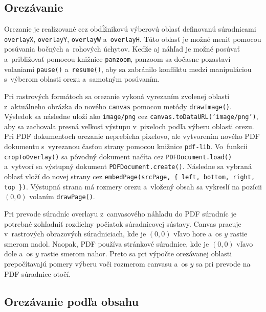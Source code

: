 \subsection{Orezávanie}

Orezanie je realizované cez obdĺžnikovú výberovú oblasť definovanú súradnicami \texttt{overlayX}, \texttt{overlayY}, \texttt{overlayW} a~\texttt{overlayH}. Túto oblasť je možné meniť pomocou posúvania bočných a~rohových úchytov. Keďže aj náhľad je možné posúvať a~približovať pomocou knižnice \texttt{panzoom}, panzoom sa dočasne pozastaví volaniami \texttt{pause()} a~\texttt{resume()}, aby sa zabránilo konfliktu medzi manipuláciou s~výberom oblasti orezu a~samotným posúvaním.

Pri rastrových formátoch sa orezanie vykoná vyrezaním zvolenej oblasti z~aktuálneho obrázka do nového \texttt{canvas} pomocou metódy \texttt{drawImage()}. Výsledok sa následne uloží ako \texttt{image/png} cez \texttt{canvas.toDataURL('image/png')}, aby sa zachovala presná veľkosť výstupu v~pixeloch podľa výberu oblasti orezu. Pri PDF dokumentoch orezanie neprebieha pixelovo, ale vytvorením nového PDF dokumentu s~vyrezanou časťou strany pomocou knižnice \texttt{pdf-lib}. Vo~funkcii \texttt{cropToOverlay()} sa pôvodný dokument načíta cez \texttt{PDFDocument.load()} a~vytvorí sa výstupný dokument \texttt{PDFDocument.create()}. Následne sa vybraná oblasť vloží do novej strany cez \texttt{embedPage(srcPage, \{ left, bottom, right, top \})}. Výstupná strana má rozmery orezu a~vložený obsah sa vykreslí na pozícii \((0,0)\) volaním \texttt{drawPage()}.

Pri prevode súradníc overlayu z~canvasového náhľadu do PDF súradníc je potrebné zohľadniť rozdielny počiatok súradnicovej sústavy. Canvas pracuje v~rastrových obrazových súradniciach, kde je \((0,0)\) vľavo hore a~os \(y\) rastie smerom nadol. Naopak, PDF používa stránkové súradnice, kde je \((0,0)\) vľavo dole a~os \(y\) rastie smerom nahor. Preto sa pri výpočte orezávanej oblasti prepočítavajú pomery výberu voči rozmerom canvasu a~os \(y\) sa pri prevode na PDF súradnice otočí.

\subsection{Orezávanie podľa obsahu}

